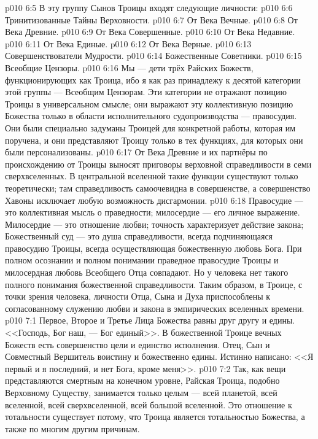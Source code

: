 \vs p010 6:5 \pc В эту группу Сынов Троицы входят следующие личности:
\vs p010 6:6 Тринитизованные Тайны Верховности.
\vs p010 6:7 От Века Вечные.
\vs p010 6:8 От Века Древние.
\vs p010 6:9 От Века Совершенные.
\vs p010 6:10 От Века Недавние.
\vs p010 6:11 От Века Единые.
\vs p010 6:12 От Века Верные.
\vs p010 6:13 Совершенствователи Мудрости.
\vs p010 6:14 Божественные Советники.
\vs p010 6:15 Всеобщие Цензоры.
\vs p010 6:16 \pc Мы --- дети трёх Райских Божеств, функционирующих как Троица, ибо я как раз принадлежу к десятой категории этой группы --- Всеобщим Цензорам. Эти категории не отражают позицию Троицы в универсальном смысле; они выражают эту коллективную позицию Божества только в области исполнительного судопроизводства --- правосудия. Они были специально задуманы Троицей для конкретной работы, которая им поручена, и они представляют Троицу только в тех функциях, для которых они были персонализованы.
\vs p010 6:17 От Века Древние и их партнёры по происхождению от Троицы выносят приговоры верховной справедливости в семи сверхвселенных. В центральной вселенной такие функции существуют только теоретически; там справедливость самоочевидна в совершенстве, а совершенство Хавоны исключает любую возможность дисгармонии.
\vs p010 6:18 Правосудие --- это коллективная мысль о праведности; милосердие --- его личное выражение. Милосердие --- это отношение любви; точность характеризует действие закона; Божественный суд --- это душа справедливости, всегда подчиняющаяся правосудию Троицы, всегда осуществляющая божественную любовь Бога. При полном осознании и полном понимании праведное правосудие Троицы и милосердная любовь Всеобщего Отца совпадают. Но у человека нет такого полного понимания божественной справедливости. Таким образом, в Троице, с точки зрения человека, личности Отца, Сына и Духа приспособлены к согласованному служению любви и закона в эмпирических вселенных времени.
\vs p010 7:1 Первое, Второе и Третье Лица Божества равны друг другу и едины. <<Господь, Бог наш, --- Бог единый>>. В божественной Троице вечных Божеств есть совершенство цели и единство исполнения. Отец, Сын и Совместный Вершитель воистину и божественно едины. Истинно написано: <<Я первый и я последний, и нет Бога, кроме меня>>.
\vs p010 7:2 \pc Так, как вещи представляются смертным на конечном уровне, Райская Троица, подобно Верховному Существу, занимается только целым --- всей планетой, всей вселенной, всей сверхвселенной, всей большой вселенной. Это отношение к тотальности существует потому, что Троица является тотальностью Божества, а также по многим другим причинам.
